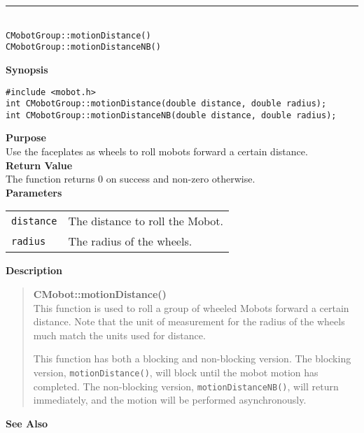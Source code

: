 \noindent
\vspace{5pt}
\rule{4.5in}{0.015in}\\
\noindent
{\LARGE \texttt{CMobotGroup::motionDistance()}}\\
{\LARGE \texttt{CMobotGroup::motionDistanceNB()}}\\
{}

\noindent
{\bf Synopsis}
\vspace{-8pt}
\begin{verbatim}
#include <mobot.h>
int CMobotGroup::motionDistance(double distance, double radius);
int CMobotGroup::motionDistanceNB(double distance, double radius);
\end{verbatim}

\noindent
{\bf Purpose}\\
Use the faceplates as wheels to roll mobots forward a certain distance.\\

\noindent
{\bf Return Value}\\
The function returns 0 on success and non-zero otherwise.\\

\noindent
{\bf Parameters}\\
\vspace{-0.1in}
\begin{description}
\item               
\begin{tabular}{p{15 mm}p{145 mm}}
\texttt{distance} & The distance to roll the Mobot.\\
\texttt{radius} & The radius of the wheels.\\
\end{tabular}
\end{description}

\noindent
{\bf Description}\\
\vspace{-12pt}
\begin{quote}
{\bf CMobot::motionDistance()}\\
This function is used to roll a group of wheeled Mobots forward a certain distance. 
Note that the unit of measurement for the radius of the wheels much match the units 
used for distance.

This function has both a blocking and non-blocking version.
The blocking version, \texttt{motionDistance()}, will block until the
mobot motion has completed. The non-blocking version, \texttt{motionDistanceNB()},
will return immediately, and the motion will be performed asynchronously.\\
\end{quote}

\noindent
{\bf See Also}\\

